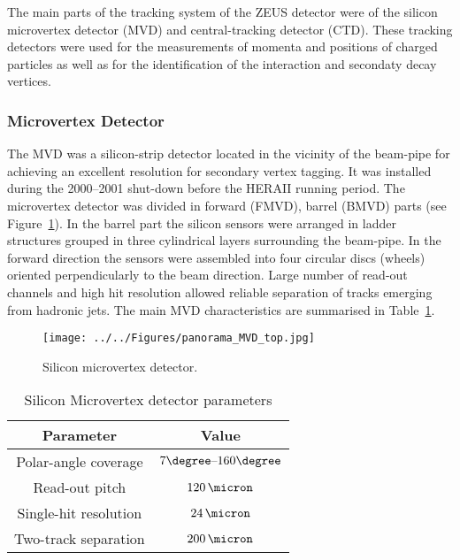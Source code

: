 The main parts of the tracking system of the ZEUS detector were of the silicon microvertex detector (MVD) and central-tracking detector (CTD). These tracking detectors were used for the measurements of momenta and positions of charged particles as well as for the identification of the interaction and secondaty decay vertices.

\subsubsection{Microvertex Detector}
\label{subsubsec:mvd}
The MVD was a silicon-strip detector located in the vicinity of the beam-pipe for achieving an excellent resolution for secondary vertex tagging. It was installed during the 2000--2001 shut-down before the HERAII running period. The microvertex detector was divided in forward (FMVD), barrel (BMVD) parts (see Figure~\ref{fig:MVD_artistic}). In the barrel part the silicon sensors were arranged in ladder structures grouped in three cylindrical layers surrounding the beam-pipe. In the forward direction the sensors were assembled into four circular discs (wheels) oriented perpendicularly to the beam direction. Large number of read-out channels and high hit resolution allowed reliable separation of tracks emerging from hadronic jets. The main MVD characteristics are summarised in Table~\ref{tab:mvdgeomparameters}. 

\begin{figure}[htbp]
	\centering
		\texttt{[image: ../../Figures/panorama\_MVD\_top.jpg]}
	\caption{Silicon microvertex detector.}
	\label{fig:MVD_artistic}
\end{figure}

\begin{table}[htbp]
\begin{tabular}{ | c | c | }
     \hline
      Parameter & Value \\
			\hline
			\hline
			Polar-angle coverage & $7\degree \mbox{--} 160\degree$ \\ \hline
      Read-out pitch & $120\,\micron$  \\ \hline
			Single-hit resolution & $24\,\micron$ \\ \hline 
			Two-track separation & $200\,\micron$ \\
      \hline
     \end{tabular}
	\caption{Silicon Microvertex detector parameters}
	\label{tab:mvdgeomparameters}
\end{table}

